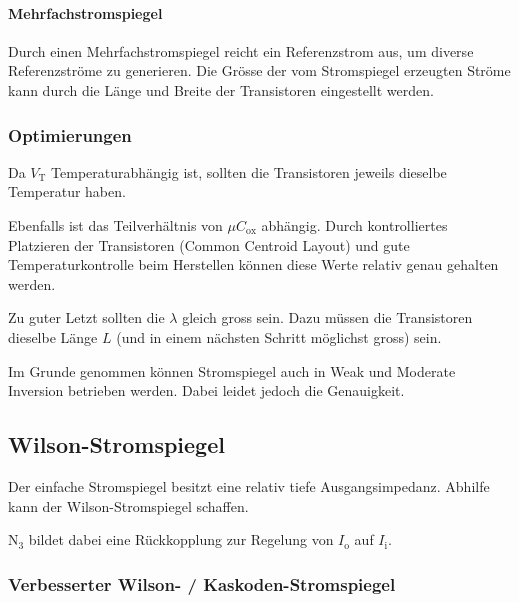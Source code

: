 \paragraph{Mehrfachstromspiegel}
Durch einen Mehrfachstromspiegel reicht ein Referenzstrom aus, um diverse Referenzströme zu generieren.
Die Grösse der vom Stromspiegel erzeugten Ströme kann durch die Länge und Breite der Transistoren eingestellt werden.

\subsubsection{Optimierungen}
Da $V_\text{T}$ Temperaturabhängig ist, sollten die Transistoren jeweils dieselbe Temperatur haben.

Ebenfalls ist das Teilverhältnis von $\mu C_\text{ox}$ abhängig.
Durch kontrolliertes Platzieren der Transistoren (Common Centroid Layout) und gute Temperaturkontrolle beim Herstellen können diese Werte relativ genau gehalten werden.

Zu guter Letzt sollten die $\lambda$ gleich gross sein.
Dazu müssen die Transistoren dieselbe Länge $L$ (und in einem nächsten Schritt möglichst gross) sein.


Im Grunde genommen können Stromspiegel auch in Weak und Moderate Inversion betrieben werden.
Dabei leidet jedoch die Genauigkeit.

\subsection{Wilson-Stromspiegel}
Der einfache Stromspiegel besitzt eine relativ tiefe Ausgangsimpedanz.
Abhilfe kann der Wilson-Stromspiegel schaffen.

$\text{N}_3$ bildet dabei eine Rückkopplung zur Regelung von $I_\text{o}$ auf $I_\text{i}$.



\subsubsection{Verbesserter Wilson- / Kaskoden-Stromspiegel}



